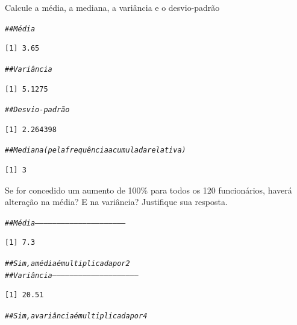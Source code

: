 \documentclass[a4paper,11pt,fleqn]{article}\usepackage[]{graphicx}\usepackage[]{color}
\makeatletter
\newcommand{\hlcom}[1]{\textcolor[rgb]{0.4,0.4,0.4}{\textit{#1}}}%
\newenvironment{kframe}{%
 \def\at@end@of@kframe{}%
 \ifinner\ifhmode%
  \def\at@end@of@kframe{\end{minipage}}%
  \begin{minipage}{\columnwidth}%
 \fi\fi%
 \def\FrameCommand##1{\hskip\@totalleftmargin \hskip-\fboxsep
 \colorbox{shadecolor}{##1}\hskip-\fboxsep
     \hskip-\linewidth \hskip-\@totalleftmargin \hskip\columnwidth}%
 \MakeFramed {\advance\hsize-\width
   \@totalleftmargin\z@ \linewidth\hsize
   \@setminipage}}%
 {\par\unskip\endMakeFramed%
 \at@end@of@kframe}
\newenvironment{knitrout}{}{} %
\theoremstyle{definition}
\makeatother
\begin{document}
\begin{compactenum}[8.]
\begin{compactenum}
\item Calcule a média, a mediana, a variância e o desvio-padrão
\begin{knitrout}\small
{}\color{fgcolor}\begin{kframe}
\begin{alltt}
\hlcom{## Média}
\end{alltt}
\begin{verbatim}
[1] 3.65
\end{verbatim}
\begin{alltt}
\hlcom{## Variância}
\end{alltt}
\begin{verbatim}
[1] 5.1275
\end{verbatim}
\begin{alltt}
\hlcom{## Desvio-padrão}
\end{alltt}
\begin{verbatim}
[1] 2.264398
\end{verbatim}
\begin{alltt}
\hlcom{## Mediana (pela frequência acumulada relativa)}
\end{alltt}
\begin{verbatim}
[1] 3
\end{verbatim}
\end{kframe}
\end{knitrout}
\item Se for concedido um aumento de 100\% para todos os 120
  funcionários, haverá alteração na média? E na variância? Justifique
  sua resposta.
\begin{knitrout}\small
{}\color{fgcolor}\begin{kframe}
\begin{alltt}
\hlcom{## Média ---------------------------------------------------------------}
\end{alltt}
\begin{verbatim}
[1] 7.3
\end{verbatim}
\begin{alltt}
\hlcom{## Sim, a média é multiplicada por 2}
\hlcom{## Variância -----------------------------------------------------------}
\end{alltt}
\begin{verbatim}
[1] 20.51
\end{verbatim}
\begin{alltt}
\hlcom{## Sim, a variância é multiplicada por 4}
\end{alltt}

\end{kframe}
\end{knitrout}
\end{compactenum}
\end{compactenum}
\end{document}
